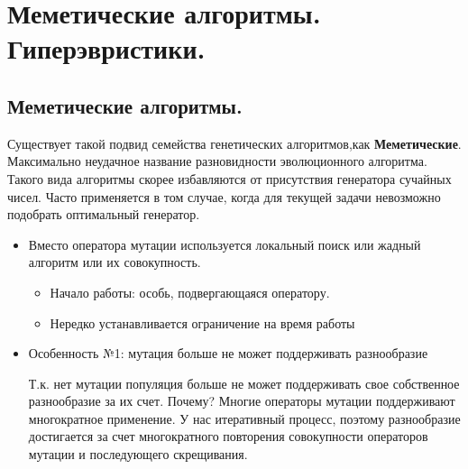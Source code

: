 \section{Меметические алгоритмы. Гиперэвристики.}
\subsection*{Меметические алгоритмы.}
Существует такой подвид семейства генетических алгоритмов,как \textbf{Меметические}. Максимально неудачное название разновидности эволюционного алгоритма. Такого вида алгоритмы скорее избавляются от присутствия генератора сучайных чисел. Часто применяется в том случае, когда для текущей задачи невозможно подобрать оптимальный генератор.
\begin{itemize}
    \item Вместо оператора мутации используется локальный поиск или жадный алгоритм или их совокупность.
    \begin{itemize}
        \item Начало работы: особь, подвергающаяся оператору. 
        \item Нередко устанавливается ограничение на время работы
    \end{itemize}
    \item Особенность №1: мутация больше не может поддерживать разнообразие
    
        Т.к. нет мутации популяция больше не может поддерживать свое собственное разнообразие за их счет.
        Почему? Многие операторы мутации поддерживают многократное применение. У нас итеративный процесс,
        поэтому разнообразие достигается за счет многократного повторения совокупности операторов мутации
        и последующего скрещивания.
        

\end{itemize}
